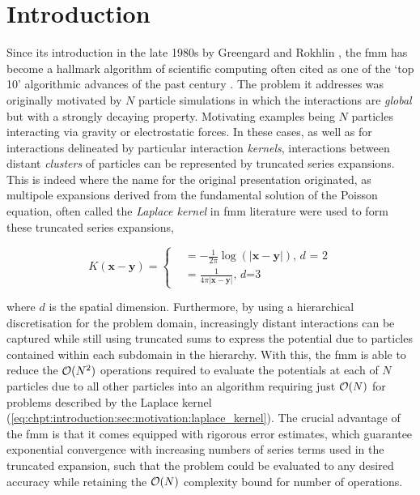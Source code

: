 
\chapter{Introduction}\label{chpt:introduction}
\thispagestyle{chaptertitle} %
Since its introduction in the late 1980s by Greengard and Rokhlin \cite{greengard1987fast}, the \acrfull{fmm} has become a hallmark algorithm of scientific computing often cited as one of the `top 10' algorithmic advances of the past century \cite{cipra2000best}. The problem it addresses was originally motivated by $N$ particle simulations in which the interactions are \textit{global} but with a strongly decaying property. Motivating examples being $N$ particles interacting via gravity or electrostatic forces. In these cases, as well as for interactions delineated by particular interaction \textit{kernels}, interactions between distant \textit{clusters} of particles can be represented by truncated series expansions. This is indeed where the name for the original presentation originated, as multipole expansions derived from the fundamental solution of the Poisson equation, often called the \textit{Laplace kernel} in \acrshort{fmm} literature were used to form these truncated series expansions,


\begin{equation}
    K(\mathbf{x-y}) =  \begin{cases}
        &= -\frac{1}{2\pi} \log(|\mathbf{x-y}|) \text{, $d$ = 2} \\
        &= \frac{1}{4\pi | \mathbf{x-y}|} \text{, $d$=3 }
    \end{cases}
    \label{eq:chpt:introduction:sec:motivation:laplace_kernel}
\end{equation}


where $d$ is the spatial dimension. Furthermore, by using a hierarchical discretisation for the problem domain, increasingly distant interactions can be captured while still using truncated sums to express the potential due to particles contained within each subdomain in the hierarchy. With this, the \acrshort{fmm} is able to reduce the $\mathcal{O}(N^2)$ operations required to evaluate the potentials at each of $N$ particles due to all other particles into an algorithm requiring just $\mathcal{O}(N)$ for problems described by the Laplace kernel (\ref{eq:chpt:introduction:sec:motivation:laplace_kernel}). The crucial advantage of the \acrshort{fmm} is that it comes equipped with rigorous error estimates, which guarantee exponential convergence with increasing numbers of series terms used in the truncated expansion, such that the problem could be evaluated to any desired accuracy while retaining the $\mathcal{O}(N)$ complexity bound for number of operations.

